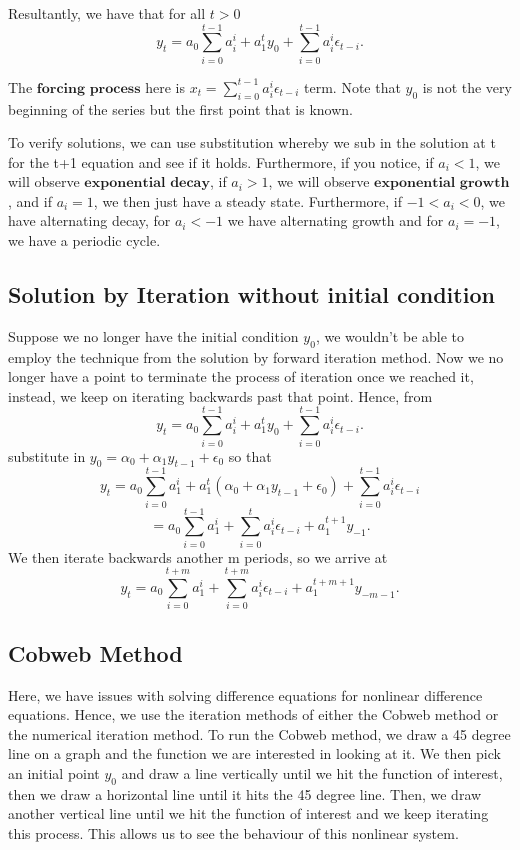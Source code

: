 \documentclass[twoside]{article}
\begin{document}
Resultantly, we have that for all $t > 0$
$$
y_t = a_0\sum_{i=0}^{t-1}a_i^i + a_1^ty_0 + \sum_{i=0}^{t-1}a_i^i\epsilon_{t-i}.
$$

The $\textbf{forcing process}$ here is $x_t = \sum_{i=0}^{t-1}a_i^i\epsilon_{t-i}$ term. Note that $y_0$ is not the very beginning of the series but the first point that is known.

To verify solutions, we can use substitution whereby we sub in the solution at t for the t+1 equation and see if it holds. Furthermore, if you notice, if $a_i < 1$, we will observe $\textbf{exponential decay}$, if $a_i > 1$, we will observe $\textbf{exponential growth}$, and if $a_i = 1$, we then just have a steady state. Furthermore, if $-1 < a_i < 0$, we have alternating decay, for $a_i < -1$ we have alternating growth and for $a_i = -1$, we have a periodic cycle.

\subsection{Solution by Iteration without initial condition}
Suppose we no longer have the initial condition $y_0$, we wouldn't be able to employ the technique from the solution by forward iteration method. Now we no longer have a point to terminate the process of iteration once we reached it, instead, we keep on iterating backwards past that point. Hence, from 
$$
y_t = a_0\sum_{i=0}^{t-1}a_i^i + a_1^ty_0 + \sum_{i=0}^{t-1}a_i^i\epsilon_{t-i}.
$$
substitute in $y_0 = \alpha_0 + \alpha_1y_{t-1} + \epsilon_0$ so that 
$$
y_t = a_0\sum_{i=0}^{t-1}a_1^i + a_1^t(\alpha_0 + \alpha_1y_{t-1} + \epsilon_0) + \sum_{i=0}^{t-1}a_i^i\epsilon_{t-i}
$$
$$
= a_0\sum_{i=0}^{t-1}a_1^i + \sum_{i=0}^{t}a_i^i\epsilon_{t-i} + a_1^{t+1}y_{-1}.
$$
We then iterate backwards another m periods, so we arrive at
$$
y_t = a_0\sum_{i=0}^{t+m}a_1^i + \sum_{i=0}^{t+m}a_i^i\epsilon_{t-i} + a_1^{t+m+1}y_{-m-1}.
$$

\subsection{Cobweb Method}
Here, we have issues with solving difference equations for nonlinear difference equations. Hence, we use the iteration methods of either the Cobweb method or the numerical iteration method. To run the Cobweb method, we draw a 45 degree line on a graph and the function we are interested in looking at it. We then pick an initial point $y_0$ and draw a line vertically until we hit the function of interest, then we draw a horizontal line until it hits the 45 degree line. Then, we draw another vertical line until we hit the function of interest and we keep iterating this process. This allows us to see the behaviour of this nonlinear system.
\end{document}
